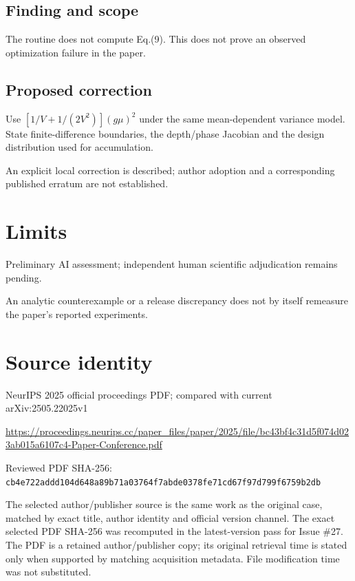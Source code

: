 \documentclass[11pt]{article}
\begin{document}
\subsection*{Finding and scope}

The routine does not compute Eq.(9). This does not prove an observed optimization failure in the paper.

\subsection*{Proposed correction}

Use \([1/V+1/(2V^2)](g\mu)^2\) under the same mean-dependent variance model. State finite-difference boundaries, the depth/phase Jacobian and the design distribution used for accumulation.

An explicit local correction is described; author adoption and a corresponding published erratum are not established.

\section*{Limits}

Preliminary AI assessment; independent human scientific adjudication remains pending.\par

An analytic counterexample or a release discrepancy does not by itself remeasure the paper’s reported experiments.\par

\section*{Source identity}

NeurIPS 2025 official proceedings PDF; compared with current arXiv:2505.22025v1

\url{https://proceedings.neurips.cc/paper_files/paper/2025/file/bc43bf4c31d5f074d023ab015a6107c4-Paper-Conference.pdf}

Reviewed PDF SHA-256: \nolinkurl{cb4e722addd104d648a89b71a03764f7abde0378fe71cd67f97d799f6759b2db}

The selected author/publisher source is the same work as the original case, matched by exact title, author identity and official version channel. The exact selected PDF SHA-256 was recomputed in the latest-version pass for Issue \#27. The PDF is a retained author/publisher copy; its original retrieval time is stated only when supported by matching acquisition metadata. File modification time was not substituted.
\end{document}
